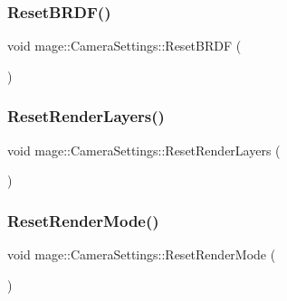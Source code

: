 \subsubsection{\texorpdfstring{Reset\+B\+R\+D\+F()}{ResetBRDF()}}
{\footnotesize\ttfamily void mage\+::\+Camera\+Settings\+::\+Reset\+B\+R\+DF (\begin{DoxyParamCaption}{ }\end{DoxyParamCaption})\hspace{0.3cm}{\ttfamily [noexcept]}}

\hypertarget{structmage_1_1_camera_settings_afc9bcdb1f27adfb1c69a668a24113b46}{}\label{structmage_1_1_camera_settings_afc9bcdb1f27adfb1c69a668a24113b46} 
\subsubsection{\texorpdfstring{Reset\+Render\+Layers()}{ResetRenderLayers()}}
{\footnotesize\ttfamily void mage\+::\+Camera\+Settings\+::\+Reset\+Render\+Layers (\begin{DoxyParamCaption}{ }\end{DoxyParamCaption})\hspace{0.3cm}{\ttfamily [noexcept]}}

\hypertarget{structmage_1_1_camera_settings_aa8facc0ddcd3e3d9f3c05c9f44c77b5d}{}\label{structmage_1_1_camera_settings_aa8facc0ddcd3e3d9f3c05c9f44c77b5d} 
\subsubsection{\texorpdfstring{Reset\+Render\+Mode()}{ResetRenderMode()}}
{\footnotesize\ttfamily void mage\+::\+Camera\+Settings\+::\+Reset\+Render\+Mode (\begin{DoxyParamCaption}{ }\end{DoxyParamCaption})\hspace{0.3cm}{\ttfamily [noexcept]}}

\hypertarget{structmage_1_1_camera_settings_a8fbc3d6013d5f711decaf6f7348f2e15}{}\label{structmage_1_1_camera_settings_a8fbc3d6013d5f711decaf6f7348f2e15} 
